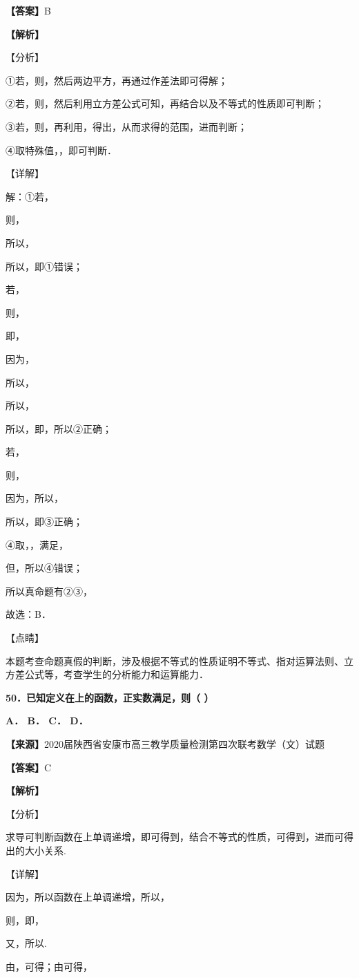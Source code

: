 \textbf{【答案】}B

\textbf{【解析】}

【分析】

①若，则，然后两边平方，再通过作差法即可得解；

②若，则，然后利用立方差公式可知，再结合以及不等式的性质即可判断；

③若，则，再利用，得出，从而求得的范围，进而判断；

④取特殊值，，即可判断．

【详解】

解：①若，

则，

所以，

所以，即①错误；

若，

则，

即，

因为，

所以，

所以，

所以，即，所以②正确；

若，

则，

因为，所以，

所以，即③正确；

④取，，满足，

但，所以④错误；

所以真命题有②③，

故选：B．

【点睛】

本题考查命题真假的判断，涉及根据不等式的性质证明不等式、指对运算法则、立方差公式等，考查学生的分析能力和运算能力．

\textbf{50．已知定义在上的函数，正实数满足，则（ ）}

\textbf{A． B． C． D．}

\textbf{【来源】}2020届陕西省安康市高三教学质量检测第四次联考数学（文）试题

\textbf{【答案】}C

\textbf{【解析】}

【分析】

求导可判断函数在上单调递增，即可得到，结合不等式的性质，可得到，进而可得出的大小关系.

【详解】

因为，所以函数在上单调递增，所以，

则，即，

又，所以.

由，可得；由可得，


